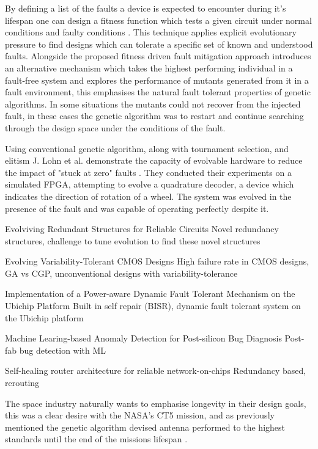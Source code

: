 By defining a list of the faults a device is expected to encounter during it's
lifespan one can design a fitness function which tests a given circuit under
normal conditions and faulty conditions \cite{Keymeulen2000}. This technique applies explicit
evolutionary pressure to find designs which can tolerate a specific set of
known and understood faults. Alongside the proposed fitness driven fault mitigation
approach \cite{Keymeulen2000} introduces an alternative mechanism which takes the
highest performing individual in a fault-free system and explores the performance
of mutants generated from it in a fault environment, this emphasises the natural
fault tolerant properties of genetic algorithms. In some situations the mutants
could not recover from the injected fault, in these cases the genetic algorithm
was to restart and continue searching through the design space under the conditions
of the fault.

Using conventional genetic algorithm, along with tournament selection, and elitism
J. Lohn et al. demonstrate the capacity
of evolvable hardware to reduce the impact of "stuck at zero" faults \cite{10.1007/3-540-36553-2_5}. They
conducted their experiments on a simulated FPGA, attempting to evolve a quadrature
decoder, a device which indicates
the direction of rotation of a wheel. The system was evolved in the presence
of the fault and was capable of operating perfectly despite it.

\todo Evolviving Redundant Structures for Reliable Circuits\cite{4291954}
Novel redundancy structures, challenge to tune evolution to find these novel structures

\todo Evolving Variability-Tolerant CMOS Designs\cite{10.1007/978-3-540-85857-7_27}
High failure rate in CMOS designs, GA vs CGP, unconventional designs with variability-tolerance

\todo Implementation of a Power-aware Dynamic Fault Tolerant Mechanism on the Ubichip Platform\cite{10.1007/978-3-642-15323-5_26}
Built in self repair (BISR), dynamic fault tolerant system on the Ubichip platform

\todo Machine Learing-based Anomaly Detection for Post-silicon Bug Diagnosis\cite{6513558}
Post-fab bug detection with ML

\todo Self-healing router architecture for reliable network-on-chips\cite{8292030}
Redundancy based, rerouting

The space industry naturally wants to emphasise longevity in their design goals,
this was a clear desire with the NASA's CT5 mission, and as previously mentioned
the genetic algorithm devised antenna performed to the highest standards until the
end of the missions lifespan \cite{Antenna}.

